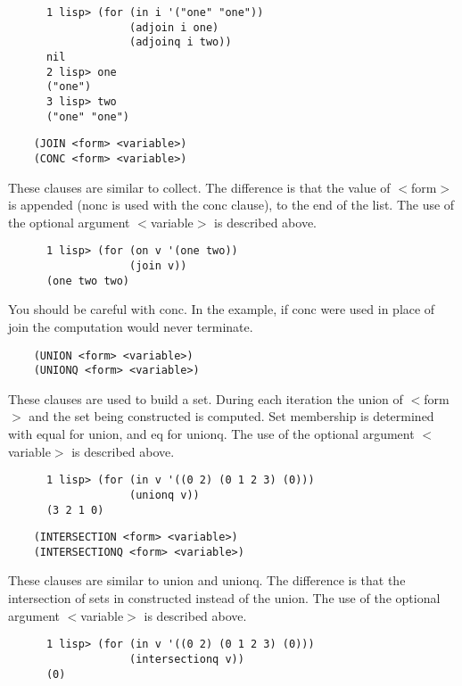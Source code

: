                                                          
\begin{verbatim}
      1 lisp> (for (in i '("one" "one"))
                   (adjoin i one)
                   (adjoinq i two))
      nil
      2 lisp> one
      ("one")
      3 lisp> two
      ("one" "one")
\end{verbatim}

\begin{verbatim}
    (JOIN <form> <variable>)
    (CONC <form> <variable>)
\end{verbatim}
      These clauses are similar to collect.  The difference is that the
      value of $<$form$>$ is appended (nonc is used with the conc
      clause), to the end of the list.  The use of the optional argument
      $<$variable$>$ is described above.

\begin{verbatim}
      1 lisp> (for (on v '(one two))
                   (join v))
      (one two two)
\end{verbatim}


      You should be careful with conc.  In the example, if conc were
      used in place of join the computation would never terminate.

\begin{verbatim}
    (UNION <form> <variable>)
    (UNIONQ <form> <variable>)
\end{verbatim}
      These clauses are used to build a set.  During each iteration the
      union of $<$form$>$ and the set being constructed is computed.  Set
      membership is determined with equal for union, and eq
      for unionq.  The use of the optional argument $<$variable$>$ is
      described above.

\begin{verbatim}
      1 lisp> (for (in v '((0 2) (0 1 2 3) (0)))
                   (unionq v))
      (3 2 1 0)
\end{verbatim}

\begin{verbatim}
    (INTERSECTION <form> <variable>)
    (INTERSECTIONQ <form> <variable>)
\end{verbatim}
      These clauses are similar to union and unionq.  The difference
      is that the intersection of sets in constructed instead of the union.
      The use of the optional argument $<$variable$>$ is described above.

\begin{verbatim}
      1 lisp> (for (in v '((0 2) (0 1 2 3) (0)))
                   (intersectionq v))
      (0)
\end{verbatim}

